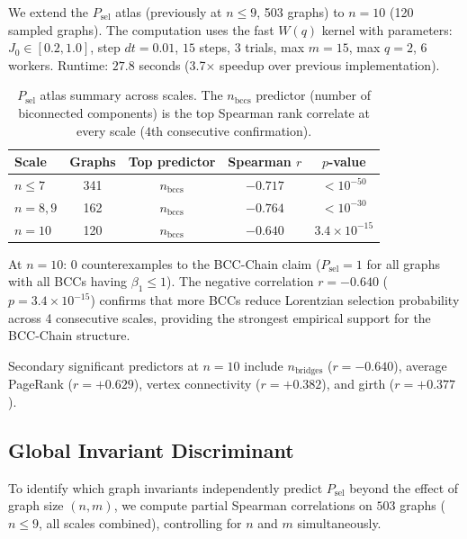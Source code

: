 \documentclass[11pt]{article}
\theoremstyle{definition}
\theoremstyle{remark}
\newcommand{\betti}{\beta_1}
\begin{document}
We extend the $P_{\mathrm{sel}}$ atlas (previously at $n \leq 9$, 503 graphs)
to $n = 10$ (120 sampled graphs). The computation uses the fast $W(q)$
kernel with parameters: $J_0 \in [0.2, 1.0]$, step $dt = 0.01$, $15$ steps,
$3$ trials, max $m = 15$, max $q = 2$, $6$ workers. Runtime: $27.8$ seconds
(3.7$\times$ speedup over previous implementation).

\begin{table}[ht]
\centering
\caption{$P_{\mathrm{sel}}$ atlas summary across scales. The $n_{\mathrm{bccs}}$
predictor (number of biconnected components) is the top Spearman rank
correlate at every scale ($4$th consecutive confirmation).}
\label{tab:psel-scales}
\renewcommand{\arraystretch}{1.3}
\begin{tabular}{lcccc}
\toprule
Scale & Graphs & Top predictor & Spearman $r$ & $p$-value \\
\midrule
$n \leq 7$ & 341 & $n_{\mathrm{bccs}}$ & $-0.717$ & $<10^{-50}$ \\
$n = 8, 9$ & 162 & $n_{\mathrm{bccs}}$ & $-0.764$ & $<10^{-30}$ \\
$n = 10$ & 120 & $n_{\mathrm{bccs}}$ & $-0.640$ & $3.4 \times 10^{-15}$ \\
\bottomrule
\end{tabular}
\end{table}

At $n = 10$: $0$ counterexamples to the BCC-Chain claim ($P_{\mathrm{sel}} = 1$
for all graphs with all BCCs having $\betti \leq 1$). The negative correlation
$r = -0.640$ ($p = 3.4 \times 10^{-15}$) confirms that more BCCs reduce
Lorentzian selection probability across 4 consecutive scales, providing
the strongest empirical support for the BCC-Chain structure.

Secondary significant predictors at $n = 10$ include $n_{\mathrm{bridges}}$
($r = -0.640$), average PageRank ($r = +0.629$), vertex connectivity
($r = +0.382$), and girth ($r = +0.377$).

\subsection{Global Invariant Discriminant}
\label{subsec:global-discriminant}

To identify which graph invariants independently predict $P_{\mathrm{sel}}$
beyond the effect of graph size $(n, m)$, we compute partial Spearman
correlations on $503$ graphs ($n \leq 9$, all scales combined), controlling
for $n$ and $m$ simultaneously.
\end{document}
